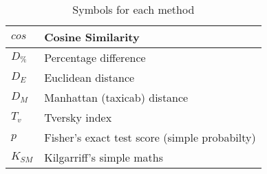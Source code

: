 \documentclass[11pt]{article}
\begin{document}
\begin{table}[h]
\begin{tabular}{|l|l|}
$cos$               & Cosine Similarity\\ \hline
$D_\%$              & Percentage difference \\ \hline
$D_E$               & Euclidean distance\\ \hline
$D_M$               & Manhattan (taxicab) distance\\ \hline
$T_v$               & Tversky index\\ \hline
$p$                 & Fisher's exact test score (simple probabilty)\\ \hline
$K_{SM}$            & Kilgarriff's simple maths\\ \hline
\end{tabular}
\caption{Symbols for each method}
\label{tab:symbols}
\end{table}






\end{document}
